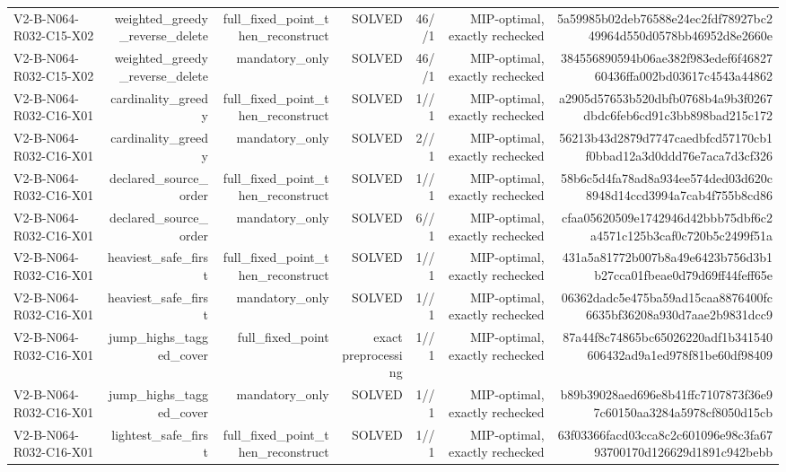 {\begin{longtable}{lrrrrrr}
V2-B-N064-R032-C15-X02 & weighted\_greedy\_reverse\_delete & full\_fixed\_point\_then\_reconstruct & SOLVED & 46//1 & MIP-optimal, exactly rechecked & 5a59985b02deb76588e24ec2fdf78927bc249964d550d0578bb46952d8e2660e \\
V2-B-N064-R032-C15-X02 & weighted\_greedy\_reverse\_delete & mandatory\_only & SOLVED & 46//1 & MIP-optimal, exactly rechecked & 384556890594b06ae382f983edef6f4682760436ffa002bd03617c4543a44862 \\
V2-B-N064-R032-C16-X01 & cardinality\_greedy & full\_fixed\_point\_then\_reconstruct & SOLVED & 1//1 & MIP-optimal, exactly rechecked & a2905d57653b520dbfb0768b4a9b3f0267dbdc6feb6cd91c3bb898bad215c172 \\
V2-B-N064-R032-C16-X01 & cardinality\_greedy & mandatory\_only & SOLVED & 2//1 & MIP-optimal, exactly rechecked & 56213b43d2879d7747caedbfcd57170cb1f0bbad12a3d0ddd76e7aca7d3cf326 \\
V2-B-N064-R032-C16-X01 & declared\_source\_order & full\_fixed\_point\_then\_reconstruct & SOLVED & 1//1 & MIP-optimal, exactly rechecked & 58b6c5d4fa78ad8a934ee574ded03d620c8948d14ccd3994a7cab4f755b8cd86 \\
V2-B-N064-R032-C16-X01 & declared\_source\_order & mandatory\_only & SOLVED & 6//1 & MIP-optimal, exactly rechecked & cfaa05620509e1742946d42bbb75dbf6c2a4571c125b3caf0c720b5c2499f51a \\
V2-B-N064-R032-C16-X01 & heaviest\_safe\_first & full\_fixed\_point\_then\_reconstruct & SOLVED & 1//1 & MIP-optimal, exactly rechecked & 431a5a81772b007b8a49e6423b756d3b1b27cca01fbeae0d79d69ff44feff65e \\
V2-B-N064-R032-C16-X01 & heaviest\_safe\_first & mandatory\_only & SOLVED & 1//1 & MIP-optimal, exactly rechecked & 06362dadc5e475ba59ad15caa8876400fc6635bf36208a930d7aae2b9831dcc9 \\
V2-B-N064-R032-C16-X01 & jump\_highs\_tagged\_cover & full\_fixed\_point & exact preprocessing & 1//1 & MIP-optimal, exactly rechecked & 87a44f8c74865bc65026220adf1b341540606432ad9a1ed978f81be60df98409 \\
V2-B-N064-R032-C16-X01 & jump\_highs\_tagged\_cover & mandatory\_only & SOLVED & 1//1 & MIP-optimal, exactly rechecked & b89b39028aed696e8b41ffc7107873f36e97c60150aa3284a5978cf8050d15cb \\
V2-B-N064-R032-C16-X01 & lightest\_safe\_first & full\_fixed\_point\_then\_reconstruct & SOLVED & 1//1 & MIP-optimal, exactly rechecked & 63f03366facd03cca8c2c601096e98c3fa6793700170d126629d1891c942bebb \\

\end{longtable}}
